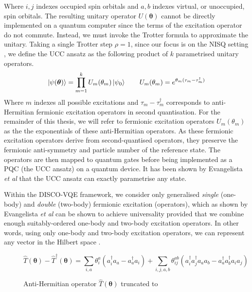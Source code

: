 Where $i, j$ indexes occupied spin orbitals and $a, b$ indexes virtual, or unoccupied, spin orbitals. The resulting unitary operator $U(\bm\theta)$ cannot be directly implemented on a quantum computer since the terms of the excitation operator do not commute. Instead, we must invoke the Trotter formula to approximate the unitary. Taking a single Trotter step $\rho=1$, since our focus is on the NISQ setting \cite{Cowtan2020}, we define the UCC ansatz as the following product of $k$ parametrised unitary operators.
\begin{equation*}
    \ket{\psi(\bm\theta)} = \prod_{m=1}^k U_m(\theta_m) \ket{\psi_0} \qquad
    U_m(\theta_m) = e^{\theta_m (\tau_m - \tau_m^\dagger)}
\end{equation*}
Where $m$ indexes all possible excitations and $\tau_m - \tau_m^\dagger$ corresponds to anti-Hermitian fermionic excitation operators in second quantisation. For the remainder of this thesis, we will refer to fermionic excitation operators $U_m(\theta_m)$ as the the exponentials of these anti-Hermitian operators. As these fermionic excitation operators derive from second-quantised operators, they preserve the fermionic anti-symmetry and particle number of the reference state. The operators are then mapped to quantum gates before being implemented as a PQC (the UCC ansatz) on a quantum device. It has been shown by Evangelista \textit{et al} \cite{Evangelista2019} that the UCC ansatz can exactly parametrise any state.

Within the DISCO-VQE framework, we consider only generalised \textit{single} (one-body) and \textit{double } (two-body) fermionic excitation (operators), which as shown by Evangelista \textit{et al} \cite{Evangelista2019} can be shown to achieve universality provided that we combine enough suitably-ordered one-body and two-body excitation operators. In other words, using only one-body and two-body excitation operators, we can represent any vector in the Hilbert space \cite{Burton2023}.


\begin{figure}[H]
    \centering
    \begin{equation*}
    \hat T(\bm{\theta}) - \hat T^{\dagger}(\bm{\theta}) =
    \sum_{i, a} \theta^a_i (a^\dagger_i a_a - a^\dagger_a a_i) + 
    \sum_{i, j, a, b} \theta^{ab}_{ij} (a^\dagger_i a^\dagger_j a_a a_b - a^\dagger_a a^\dagger_b a_i a_j)
    \end{equation*}
    \caption{Anti-Hermitian operator $\hat T(\bm{\theta})$ truncated to }
\end{figure}
